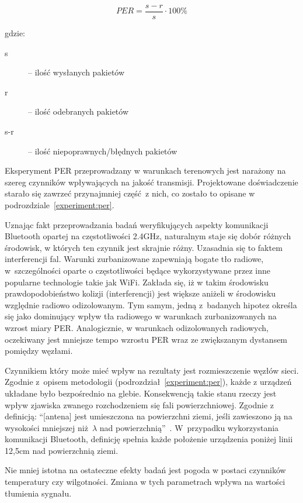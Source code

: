\begin{equation}
\label{per_equation}
PER = \frac{s - r}{s} \cdot 100\%
\end{equation}

gdzie:

\begin{description}
\item[s] -- ilość wysłanych pakietów
\item[r] -- ilość odebranych pakietów
\item[s-r] -- ilość niepoprawnych/błędnych pakietów
\end{description}

Eksperyment PER przeprowadzany w warunkach terenowych jest narażony na szereg czynników wpływających
na jakość transmisji. Projektowane doświadczenie starało się zawrzeć przynajmniej część z nich, co
zostało to opisane w podrozdziale~\ref{experiment:per}.

Uznając fakt przeprowadzania badań weryfikujących aspekty komunikacji Bluetooth opartej na częstotliwości
2.4GHz, naturalnym staje się dobór różnych środowisk, w których ten czynnik jest skrajnie różny.
Uzasadnia się to faktem interferencji fal. Warunki zurbanizowane zapewniają bogate tło radiowe,
w~szczególności oparte o częstotliwości będące wykorzystywane przez inne popularne technologie
takie jak WiFi. Zakłada się, iż w takim środowisku prawdopodobieństwo kolizji (interferencji)
jest większe aniżeli w środowisku względnie radiowo odizolowanym. Tym samym, jedną z~badanych
hipotez określa się jako dominujący wpływ tła radiowego w warunkach zurbanizowanych na wzrost
miary \gls{PER}. Analogicznie, w warunkach odizolowanych radiowych, oczekiwany jest mniejsze
tempo wzrostu PER wraz ze zwiększanym dystansem pomiędzy węzłami.

Czynnikiem który może mieć wpływ na rezultaty jest rozmieszczenie węzłów sieci. Zgodnie
z~opisem metodologii (podrozdział~\ref{experiment:per}), każde z urządzeń układane było
bezpośrednio na glebie. Konsekwencją takie stanu rzeczy jest wpływ zjawiska zwanego
rozchodzeniem się fali powierzchniowej. Zgodnie z definicją: \enquote{[antena] jest umieszczona na powierzchni
ziemi, jeśli zawieszono ją na wysokości mniejszej niż $\lambda$ nad powierzchnią}~\cite{szostka_fale_2006}. 
W~przypadku wykorzystania komunikacji Bluetooth, definicję spełnia każde położenie
urządzenia poniżej linii 12,5cm nad powierzchnią ziemi.

Nie mniej istotna na ostateczne efekty badań jest pogoda w postaci czynników temperatury
czy wilgotności. Zmiana w tych parametrach wpływa na wartości tłumienia sygnału.
